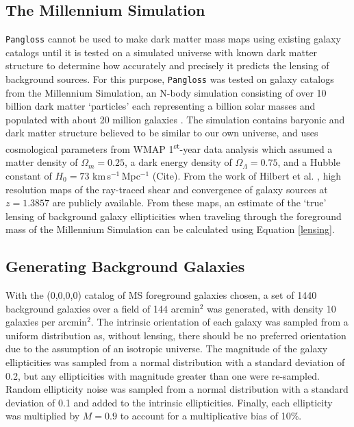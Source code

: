 \documentclass[%
 reprint,
 amsmath,amssymb,
 aps,nofootinbib
]{revtex4-1}
\begin{document}
\subsection{The Millennium Simulation} \label{ms}
\texttt{Pangloss} cannot be used to make dark matter mass maps using existing galaxy catalogs until it is tested on a simulated universe with known dark matter structure to determine how accurately and precisely it predicts the lensing of background sources. For this purpose, \texttt{Pangloss} was tested on galaxy catalogs from the Millennium Simulation, an N-body simulation consisting of over 10 billion dark matter `particles' each representing a billion solar masses and populated with about 20 million galaxies \cite{millennium_simulation}. The simulation contains baryonic and dark matter structure believed to be similar to our own universe, and uses cosmological parameters from WMAP 1\textsuperscript{st}-year data analysis which assumed a matter density of $\Omega_m=0.25$, a dark energy density of $\Omega_\Lambda=0.75$, and a Hubble constant of $H_0=73$ km$\,$s$^{-1}\,$Mpc$^{-1}$ (Cite). From the work of Hilbert et al. \cite{ray_tracing}, high resolution maps of the ray-traced shear and convergence of galaxy sources at $z=1.3857$ are publicly available. From these maps, an estimate of the `true' lensing of background galaxy ellipticities when traveling through the foreground mass of the Millennium Simulation can be calculated using Equation \eqref{lensing}.


\subsection{Generating Background Galaxies}
With the (0,0,0,0) catalog of MS foreground galaxies chosen, a set of 1440 background galaxies over a field of 144 arcmin$^2$ was generated, with density 10 galaxies per arcmin$^2$. The intrinsic orientation of each galaxy was sampled from a uniform distribution as, without lensing, there should be no preferred orientation due to the assumption of an isotropic universe. The magnitude of the galaxy ellipticities was sampled from a normal distribution with a standard deviation of 0.2, but any ellipticities with magnitude greater than one were re-sampled. Random ellipticity noise was sampled from a normal distribution with a standard deviation of 0.1 and added to the intrinsic ellipticities. Finally, each ellipticity was multiplied by $M=0.9$ to account for a multiplicative bias of 10\%.
\end{document}
